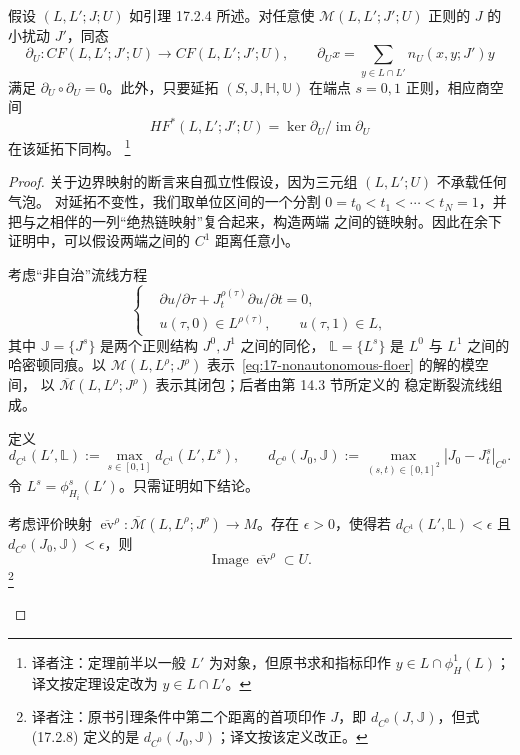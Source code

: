 \begin{theorem}
\label{thm:local-floer-boundary-continuation}
假设 $(L,L';J;U)$ 如引理 17.2.4 所述。对任意使
$\mathcal M(L,L';J';U)$ \personFredholm{}正则的 $J$ 的小扰动 $J'$，同态
\[
 \partial_U:CF(L,L';J';U)\longrightarrow CF(L,L';J';U),
 \qquad
 \partial_Ux=\sum_{y\in L\cap L'}n_U(x,y;J')y
\]
满足 $\partial_U\circ\partial_U=0$。此外，只要延拓
$(S,\mathbb J,\mathbb H,\mathbb U)$ 在端点 $s=0,1$ \personFloer{}正则，相应商空间
\[
 HF^*(L,L';J';U)=\ker\partial_U/\operatorname{im}\partial_U
\]
在该延拓下同构。
\footnote{译者注：定理前半以一般 $L'$ 为对象，但原书求和指标印作
$y\in L\cap\phi_H^1(L)$；译文按定理设定改为 $y\in L\cap L'$。}
\end{theorem}

\begin{proof}
关于边界映射的断言来自孤立性假设，因为三元组 $(L,L';U)$ 不承载任何气泡。
对延拓不变性，我们取单位区间的一个分割
$0=t_0<t_1<\cdots<t_N=1$，并把与之相伴的一列“绝热链映射”复合起来，构造两端
之间的链映射。因此在余下证明中，可以假设两端之间的 $C^1$ 距离任意小。

考虑“非自治”\personFloer{}流线方程
\begin{equation}
 \left\{
 \begin{aligned}
 &\partial u/\partial\tau+J_t^{\rho(\tau)}\partial u/\partial t=0,\\
 &u(\tau,0)\in L^{\rho(\tau)},\qquad u(\tau,1)\in L,
 \end{aligned}
 \right.
\label{eq:17-nonautonomous-floer}
\end{equation}
其中 $\mathbb J=\{J^s\}$ 是两个\personFredholm{}正则结构 $J^0,J^1$ 之间的同伦，
$\mathbb L=\{L^s\}$ 是 $L^0$ 与 $L^1$ 之间的哈密顿同痕。以
$\mathcal M(L,L^\rho;J^\rho)$ 表示~\eqref{eq:17-nonautonomous-floer} 的解的模空间，
以 $\overline{\mathcal M}(L,L^\rho;J^\rho)$ 表示其闭包；后者由第 14.3 节所定义的
稳定断裂\personFloer{}流线组成。

定义
\begin{equation}
 d_{C^1}(L',\mathbb L):=\max_{s\in[0,1]}d_{C^1}(L',L^s),
 \qquad
 d_{C^0}(J_0,\mathbb J):=\max_{(s,t)\in[0,1]^2}|J_0-J_t^s|_{C^0}.
\label{eq:17-continuation-distances}
\end{equation}
令 $L^s=\phi_{H_i}^s(L')$。只需证明如下结论。

\begin{lemma}
\label{lem:continuation-evaluation-in-U}
考虑评价映射
$\overline{\operatorname{ev}}^\rho:
\overline{\mathcal M}(L,L^\rho;J^\rho)\to M$。存在
$\epsilon>0$，使得若
$d_{C^1}(L',\mathbb L)<\epsilon$ 且
$d_{C^0}(J_0,\mathbb J)<\epsilon$，则
\[
 \operatorname{Image}\overline{\operatorname{ev}}^\rho\subset U.
\]
\footnote{译者注：原书引理条件中第二个距离的首项印作 $J$，即
$d_{C^0}(J,\mathbb J)$，但式 (17.2.8) 定义的是
$d_{C^0}(J_0,\mathbb J)$；译文按该定义改正。}
\end{lemma}


\end{proof}
